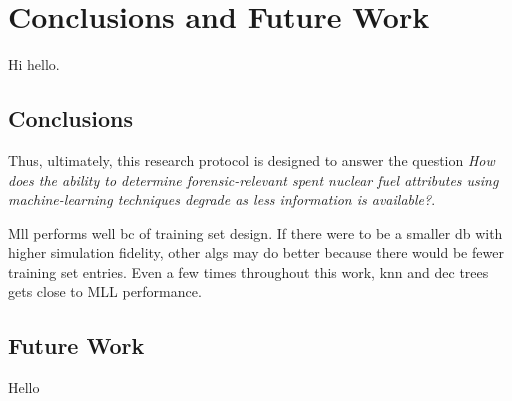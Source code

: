 \chapter{Conclusions and Future Work}
\label{ch:concl}

Hi hello.

\section{Conclusions}
\label{sec:concl}

Thus, ultimately, this research protocol is designed to answer the question
\textit{How does the ability to determine forensic-relevant spent nuclear fuel
attributes using machine-learning techniques degrade as less information is
available?}. 

Mll performs well bc of training set design. If there were to be a smaller db
with higher simulation fidelity, other algs may do better because there would
be fewer training set entries. Even a few times throughout this work, knn and
dec trees gets close to MLL performance.

\section{Future Work}
\label{sec:future}

Hello
